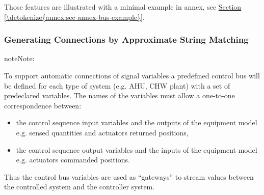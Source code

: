 \documentclass[letterpaper,10pt, openany,english]{sphinxmanual}
\begin{document}
Those features are illustrated with a minimal example in annex, see \hyperref[\detokenize{annex:sec-annex-bus-example}]{Section \ref{\detokenize{annex:sec-annex-bus-example}}}.


\subsubsection{Generating Connections by Approximate String Matching}
\label{\detokenize{requirements:generating-connections-by-approximate-string-matching}}
\begin{sphinxadmonition}{note}{Note:}
\end{sphinxadmonition}

To support automatic connections of signal variables a predefined control bus will be defined for each type of system (e.g. AHU, CHW plant) with a set of predeclared variables. The names of the variables must allow a one-to-one correspondence between:
\begin{itemize}
\item {} 
the control sequence input variables and the outputs of the equipment model e.g. sensed quantities and actuators returned positions,

\item {} 
the control sequence output variables and the inputs of the equipment model e.g. actuators commanded positions.

\end{itemize}

Thus the control bus variables are used as “gateways” to stream values between the controlled system and the controller system.
\end{document}
